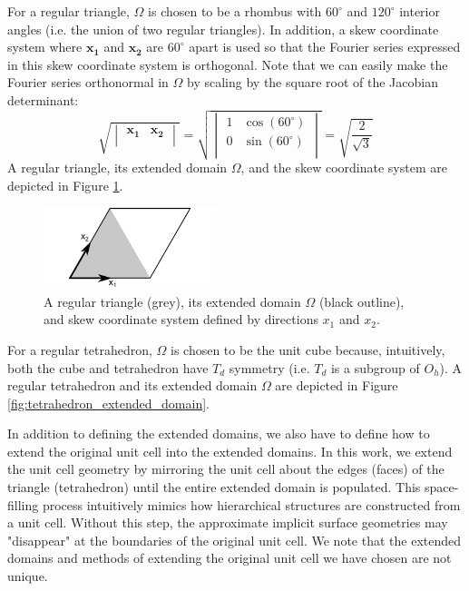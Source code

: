 \documentclass[acmtog]{acmart}
\begin{document}
For a regular triangle, $\Omega$ is chosen to be a rhombus with $60^\circ$ and $120^\circ$ interior angles (i.e. the union of two regular triangles). In addition, a skew coordinate system where $\mathbf{x_1}$ and $\mathbf{x_2}$ are $60^\circ$ apart is used so that the Fourier series expressed in this skew coordinate system is orthogonal. Note that we can easily make the Fourier series orthonormal in $\Omega$ by scaling by the square root of the Jacobian determinant:
\begin{equation}
  \sqrt{
    \begin{vmatrix}
      \mathbf{x_1} & \mathbf{x_2} \\
    \end{vmatrix}
  } = \sqrt{
    \begin{vmatrix}
      1 & \cos(60^{\circ}) \\
      0 & \sin(60^{\circ}) \\
    \end{vmatrix}
  } = \sqrt{\frac{2}{\sqrt{3}}}
\end{equation}
A regular triangle, its extended domain $\Omega$, and the skew coordinate system are depicted in Figure \ref{fig:triangle_extended_domain_skew_coordinates}.
%
\begin{figure}
  \centering
  \includegraphics[width=0.45\textwidth]{figures/triangle_extended_domain.pdf}
  \caption{A regular triangle (grey), its extended domain $\Omega$ (black outline), and skew coordinate system defined by directions $x_1$ and $x_2$.}
  \label{fig:triangle_extended_domain_skew_coordinates}
\end{figure}
%
For a regular tetrahedron, $\Omega$ is chosen to be the unit cube because, intuitively, both the cube and tetrahedron have $T_d$ symmetry (i.e. $T_d$ is a subgroup of $O_h$). A regular tetrahedron and its extended domain $\Omega$ are depicted in Figure \ref{fig:tetrahedron_extended_domain}.

In addition to defining the extended domains, we also have to define how to extend the original unit cell into the extended domains. In this work, we extend the unit cell geometry by mirroring the unit cell about the edges (faces) of the triangle (tetrahedron) until the entire extended domain is populated. This space-filling process intuitively mimics how hierarchical structures are constructed from a unit cell. Without this step, the approximate implicit surface geometries may "disappear" at the boundaries of the original unit cell. We note that the extended domains and methods of extending the original unit cell we have chosen are not unique.
\end{document}
